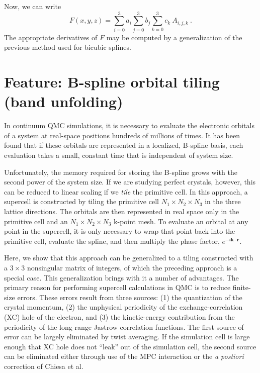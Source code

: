 Now, we can write
\begin{equation}
F(x,y,z) = \sum_{i=0}^3 a_i \sum_{j=0}^3 b_j \sum_{k=0}^3 c_k \ A_{i,j,k}\:. 
\end{equation}
The appropriate derivatives of $F$ may be computed by a generalization
of the previous method used for bicubic splines.


\section{Feature: B-spline orbital tiling (band unfolding)}


In continuum QMC simulations, it is necessary to
evaluate the electronic orbitals of a system at real-space positions
hundreds of millions of times.  It has been found that if
these orbitals are represented in a localized, B-spline basis, each
evaluation takes a small, constant time that is independent of system
size.

Unfortunately, the memory required for storing the B-spline grows with
the second power of the system size.  If we are studying perfect
crystals, however, this can be reduced to linear scaling if we {\em
  tile} the primitive cell.  In this approach, 
a supercell is constructed by tiling the
primitive cell $N_1 \times N_2 \times N_3$ in the three lattice
directions.  The orbitals are then represented in real space only in
the primitive cell and an $N_1 \times N_2 \times N_3$ k-point mesh.
To evaluate an orbital at any point in the supercell, it is only
necessary to wrap that point back into the primitive cell, evaluate
the spline, and then multiply the phase factor,
$e^{-i\mathbf{k}\cdot\mathbf{r}}$.  

Here, we show that this approach can be generalized to a tiling
constructed with a $3\times 3$ nonsingular matrix of integers, of which
the preceding approach is a special case.  This generalization brings with
it a number of advantages.  The primary reason for performing
supercell calculations in QMC is to reduce finite-size errors.  These
errors result from three sources:  (1) the quantization of the crystal
momentum,  (2) the unphysical periodicity of the exchange-correlation (XC)
hole of the electron, and (3) the kinetic-energy contribution from the
periodicity of the long-range Jastrow correlation functions.  The first
source of error can be largely eliminated by twist averaging.  If the
simulation cell is large enough that XC hole does not ``leak'' out of
the simulation cell, the second source can be eliminated either
through use of the MPC interaction or the {\em a postiori} correction
of Chiesa et al.  

